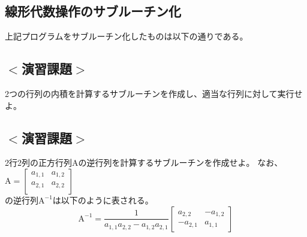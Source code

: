 \subsection{線形代数操作のサブルーチン化}
上記プログラムをサブルーチン化したものは以下の通りである。



\subsection*{$<$演習課題$>$}
2つの行列の内積を計算するサブルーチンを作成し、適当な行列に対して実行せよ。

\subsection*{$<$演習課題$>$}
2行2列の正方行列$\mathrm{A}$の逆行列を計算するサブルーチンを作成せよ。
なお、
$\mathrm{A} =
\begin{bmatrix}
  a_{1,1} & a_{1,2} \\
  a_{2,1} & a_{2,2} \\
\end{bmatrix}
$\\
の逆行列$\mathrm{A}^{-1}$は以下のように表される。
\begin{equation}
\mathrm{A}^{-1} = \frac{1}{a_{1,1}a_{2,2}-a_{1,2}a_{2,1}}
\begin{bmatrix}
  a_{2,2} & -a_{1,2}\\
  -a_{2,1} & a_{1,1}
\end{bmatrix}
\end{equation}


